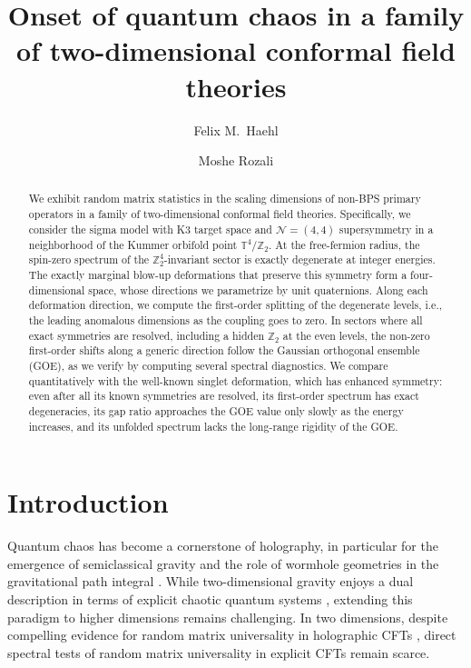 \documentclass[aps,twocolumn,preprintnumbers,groupedaddress,nofootinbib,prl]{revtex4-2}
\newcommand{\Tf}{\mathbb T^4}
\begin{document}
\title{Onset of quantum chaos in a family of two-dimensional conformal field theories}

\author{Felix M.\ Haehl}
\author{Moshe Rozali}

\begin{abstract}
We exhibit random matrix statistics in the scaling dimensions of non-BPS primary operators in a family of two-dimensional conformal field theories. Specifically, we consider the sigma model with K3 target space and $\mathcal N=(4,4)$ supersymmetry in a neighborhood of the Kummer orbifold point $\Tf/\mathbb Z_2$. At the free-fermion radius, the spin-zero spectrum of the $\mathbb Z_2^4$-invariant sector is exactly degenerate at integer energies. The exactly marginal blow-up deformations that preserve this symmetry form a four-dimensional space, whose directions we parametrize by unit quaternions. Along each deformation direction, we compute the first-order splitting of the degenerate levels, i.e., the leading anomalous dimensions as the coupling goes to zero. In sectors where all exact symmetries are resolved, including a hidden $\mathbb Z_2$ at the even levels, the non-zero first-order shifts along a generic direction follow the Gaussian orthogonal ensemble (GOE), as we verify by computing several spectral diagnostics. We compare quantitatively with the well-known singlet deformation, which has enhanced symmetry: even after all its known symmetries are resolved, its first-order spectrum has exact degeneracies, its gap ratio approaches the GOE value only slowly as the energy increases, and its unfolded spectrum lacks the long-range rigidity of the GOE.
\end{abstract}

\maketitle



\section{Introduction}
\label{sec:intro}

Quantum chaos has become a cornerstone of holography, in particular for the emergence of semiclassical gravity and the role of wormhole geometries in the gravitational path integral \cite{Shenker:2013pqa,Maldacena:2015waa,Cotler:2016fpe}. While two-dimensional gravity \cite{Almheiri:2014cka,Maldacena:2016upp} enjoys a dual description in terms of explicit chaotic quantum systems \cite{Sachdev:2015efa,Maldacena:2016hyu,Saad:2019lba}, extending this paradigm to higher dimensions remains challenging. In two dimensions, despite compelling evidence for random matrix universality in holographic CFTs \cite{Cotler:2020ugk,Haehl:2023tkr,DiUbaldo:2023qli,Boruch:2025ilr}, direct spectral tests of random matrix universality in explicit CFTs remain scarce.
\end{document}
